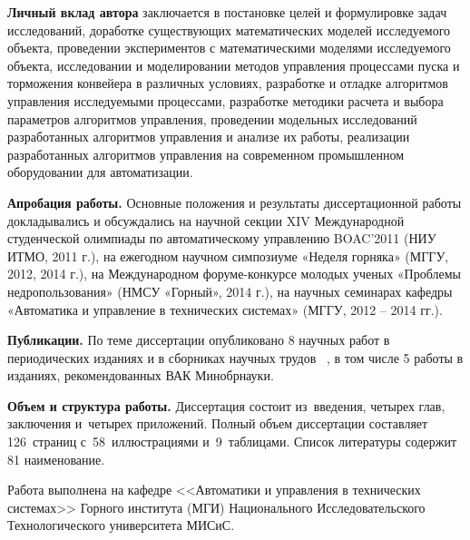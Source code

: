 \textbf{Личный вклад автора} заключается в постановке целей и формулировке задач исследований, доработке существующих математических моделей исследуемого объекта, проведении экспериментов с математическими моделями исследуемого объекта, исследовании и моделировании методов управления процессами пуска и торможения конвейера в различных условиях, разработке и отладке алгоритмов управления исследуемыми процессами, разработке методики расчета и выбора параметров алгоритмов управления, проведении модельных исследований разработанных алгоритмов управления и анализе их работы, реализации разработанных алгоритмов управления на современном промышленном оборудовании для автоматизации.
\bigskip

\textbf{Апробация работы.} Основные положения и результаты диссертационной работы докладывались и обсуждались на научной секции XIV Международной студенческой олимпиады по автоматическому управлению BOAC’2011 (НИУ ИТМО, 2011 г.), на ежегодном научном симпозиуме «Неделя горняка» (МГГУ, 2012, 2014 г.), на Международном форуме-конкурсе молодых ученых «Проблемы недропользования» (НМСУ «Горный», 2014 г.), на научных семинарах кафедры «Автоматика и управление в технических системах» (МГГУ, 2012 -- 2014 гг.).

\bigskip
\textbf{Публикации.} По теме диссертации опубликовано 8 научных работ в периодических изданиях и в сборниках научных трудов ~\cite{bib1, bib2, bib3, bib4, bib6, bib7, bib8, bib9}, в том числе 5 работы в изданиях, рекомендованных ВАК Минобрнауки.

\bigskip
\textbf{Объем и структура работы.} Диссертация состоит из~введения, четырех глав, заключения и~четырех приложений. Полный объем диссертации составляет 126~страниц с~58~иллюстрациями и~9~таблицами. Список литературы содержит 81 наименование.

\bigskip
Работа выполнена на кафедре <<Автоматики и управления в технических системах>> Горного института (МГИ) Национального Исследовательского Технологического университета МИСиС.

\clearpage
